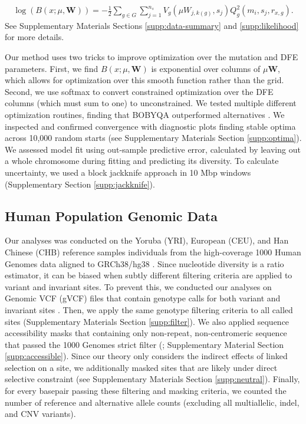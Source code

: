 \documentclass[11pt]{article}
\begin{document}
\begin{align}
    \log\left(B(x; \mu, \mathbf{W}) \right) = - \frac{1}{2} \sum_{g \in G} \sum_{j=1}^{n_s} V_g(\mu W_{j, k(g)}, s_j) Q_g^2(m_i, s_j, r_{x, g}).
\end{align}
%
See Supplementary Materials Sections \ref{supp:data-summary} and
\ref{supp:likelihood} for more details.

Our method uses two tricks to improve optimization over the mutation and DFE
parameters. First, we find $B(x; \mu, \mathbf{W})$ is exponential over columns
of $\mu \mathbf{W}$, which allows for optimization over this smooth function
rather than the grid. Second, we use softmax to convert constrained
optimization over the DFE columns (which must sum to one) to unconstrained. We
tested multiple different optimization routines, finding that BOBYQA
outperformed alternatives \parencite{Powell2009-jm,Johnson2007-tl}. We
inspected and confirmed convergence with diagnostic plots finding stable optima
across 10,000 random starts (see Supplementary Materials Section
\ref{supp:optima}). We assessed model fit using out-sample predictive error,
calculated by leaving out a whole chromosome during fitting and predicting its
diversity. To calculate uncertainty, we used a block jackknife approach in 10
Mbp windows (Supplementary Section \ref{supp:jackknife}).

\subsection*{Human Population Genomic Data}
\label{sec:methods-data}

Our analyses was conducted on the Yoruba (YRI), European (CEU), and Han Chinese
(CHB) reference samples individuals from the high-coverage 1000 Human Genomes
data aligned to GRCh38/hg38 \parencite{Byrska-Bishop2022-tn}. Since nucleotide
diversity is a ratio estimator, it can be biased when subtly different
filtering criteria are applied to variant and invariant sites. To prevent this,
we conducted our analyses on Genomic VCF (gVCF) files that contain genotype
calls for both variant and invariant sites \parencite{Illumina_Inc2020-dk}.
Then, we apply the same genotype filtering criteria to all called sites
(Supplementary Materials Section \ref{supp:filter}). We also applied sequence
accessibility masks that containing only non-repeat, non-centromeric sequence
that passed the 1000 Genomes strict filter
(\cite{1000_Genomes_Project_Consortium2015-mi}; Supplementary Material Section
\ref{supp:accessible}). Since our theory only considers the indirect effects of
linked selection on a site, we additionally masked sites that are likely under
direct selective constraint (see Supplementary Materials Section
\ref{supp:neutral}). Finally, for every basepair passing these filtering and
masking criteria, we counted the number of reference and alternative allele
counts (excluding all multiallelic, indel, and CNV variants).
\end{document}
